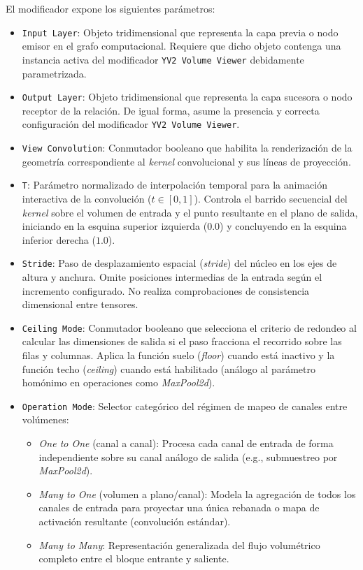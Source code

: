 El modificador expone los siguientes parámetros:
\begin{itemize}
    \item \texttt{Input Layer}: Objeto tridimensional que representa la capa previa o nodo emisor en el grafo computacional. Requiere que dicho objeto contenga una 
    instancia activa del modificador \texttt{YV2 Volume Viewer} debidamente parametrizada.
    \item \texttt{Output Layer}: Objeto tridimensional que representa la capa sucesora o nodo receptor de la relación. De igual forma, asume la presencia y correcta 
    configuración del modificador \texttt{YV2 Volume Viewer}.
    \item \texttt{View Convolution}: Conmutador booleano que habilita la renderización de la geometría correspondiente al \textit{kernel} convolucional y sus líneas de proyección.
    \item \texttt{T}: Parámetro normalizado de interpolación temporal para la animación interactiva de la convolución ($t \in [0, 1]$). Controla el barrido secuencial del 
    \textit{kernel} sobre el volumen de entrada y el punto resultante en el plano de salida, iniciando en la esquina superior izquierda ($0.0$) y concluyendo en la esquina inferior derecha ($1.0$).
    \item \texttt{Stride}: Paso de desplazamiento espacial (\textit{stride}) del núcleo en los ejes de altura y anchura. Omite posiciones intermedias de la entrada 
    según el incremento configurado. No realiza comprobaciones de consistencia dimensional entre tensores.
    \item \texttt{Ceiling Mode}: Conmutador booleano que selecciona el criterio de redondeo al calcular las dimensiones de salida si el paso fracciona el recorrido 
    sobre las filas y columnas. Aplica la función suelo (\textit{floor}) cuando está inactivo y la función techo (\textit{ceiling}) cuando está habilitado 
    (análogo al parámetro homónimo en operaciones como \textit{MaxPool2d}).
    \item \texttt{Operation Mode}: Selector categórico del régimen de mapeo de canales entre volúmenes:
    \begin{itemize}
        \item \textit{One to One} (canal a canal): Procesa cada canal de entrada de forma independiente sobre su canal análogo de salida (e.g., submuestreo por \textit{MaxPool2d}).
        \item \textit{Many to One} (volumen a plano/canal): Modela la agregación de todos los canales de entrada para proyectar una única rebanada o 
        mapa de activación resultante (convolución estándar).
        \item \textit{Many to Many}: Representación generalizada del flujo volumétrico completo entre el bloque entrante y saliente.
    \end{itemize}
\end{itemize}
